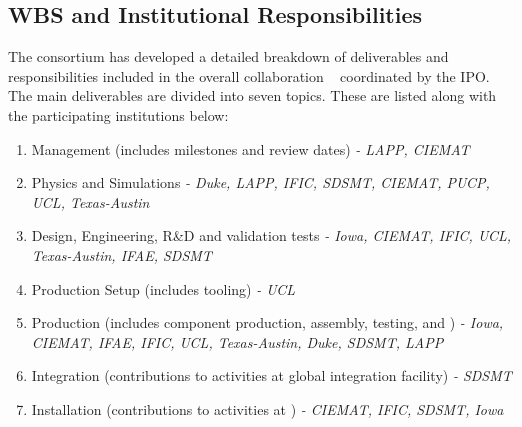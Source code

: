 


\subsection{WBS and Institutional Responsibilities}

The \dual {} consortium has developed a detailed breakdown of deliverables and responsibilities included in the overall  collaboration ~\cite{bib:docdb5594} coordinated by the IPO. The main deliverables are %
divided into seven topics. These are listed along with the participating institutions below: 

\begin{enumerate}
\item Management \dual {} (includes milestones and review dates) \textit{- LAPP, CIEMAT }
\item Physics and Simulations \textit{- Duke, LAPP, IFIC, SDSMT, CIEMAT, PUCP, UCL, Texas-Austin}
\item Design, Engineering, R\&D and validation tests \textit{- Iowa, CIEMAT, IFIC, UCL, Texas-Austin, IFAE, SDSMT}
\item Production Setup (includes tooling) \textit{- UCL}
\item Production (includes component production, assembly, testing, and ) \textit{- Iowa, CIEMAT, IFAE, IFIC, UCL, Texas-Austin, Duke, SDSMT, LAPP}
\item Integration (contributions to activities at global integration facility) \textit{- SDSMT}
\item Installation (contributions to activities at \surf) \textit{- CIEMAT, IFIC, SDSMT, Iowa}
\end{enumerate}

